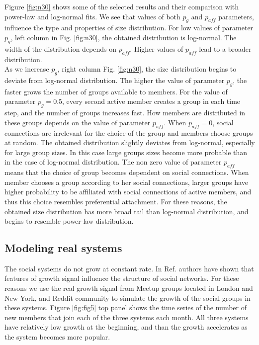 Figure \ref{fig:n30} shows some of the selected results and their comparison with power-law and log-normal fits. We see that values of both $p_g$ and $p_{aff}$ parameters, influence the type and properties of size distribution. For low values of parameter $p_{g}$, left column in Fig. \ref{fig:n30}, the obtained distribution is log-normal. The width of the distribution depends on $p_{aff}$. Higher values of $p_{aff}$ lead to a broader distribution.\\
As we increase $p_{g}$, right column Fig. \ref{fig:n30}, the size distribution begins to deviate from
log-normal distribution. The higher the value of parameter $p_{g}$, the faster grows the number of groups available to members. For the value of parameter $p_{g}=0.5$, every second active member creates a group in each time step, and the number of groups increases fast. How members are distributed in these groups depends on the value of parameter $p_{aff}$. When $p_{aff}=0$, social connections are irrelevant for the choice of the group and members choose groups at random. The obtained distribution slightly deviates from log-normal, especially for large group sizes. In this case large groups sizes become more probable than in the case of log-normal distribution. The non zero value of parameter $p_{aff}$ means that the choice of group becomes dependent on social connections. When member chooses a group according to her social connections, larger groups have higher probability to be affiliated with social connections of active members, and thus this choice resembles preferential attachment. For these reasons, the obtained size distribution has more broad tail than log-normal distribution, and begins to resemble power-law distribution.\\ 

\subsection{Modeling real systems}

The social systems do not grow at constant rate. In Ref. \cite{vranic2021growth} authors have shown that features of growth signal influence the  structure of social networks. For these reasons we use the real growth signal from Meetup groups located in London and New York, and Reddit community to simulate the growth of the social groups in these systems. Figure \ref{fig:fig5} top panel shows the time series of the number of new members that join each of the three systems each month. All three systems have relatively low growth at the beginning, and than the growth accelerates as the system becomes more popular.\\ 


